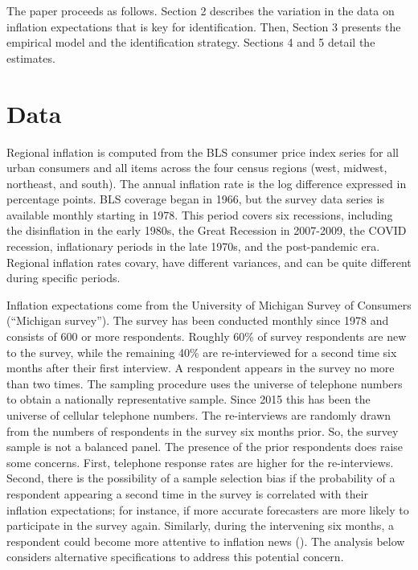 \documentclass[12pt]{article}
\begin{document}
The paper proceeds as follows. Section 2 describes the variation in the data on inflation expectations that is key for identification. Then, Section 3 presents the empirical model and the identification strategy. Sections 4 and 5 detail the estimates.

\section{Data}

Regional inflation is computed from the BLS consumer price index series for all urban consumers and all items across the four census regions (west, midwest, northeast, and south). The annual inflation rate is the log difference expressed in percentage points. BLS coverage began in 1966, but the survey data series is available monthly starting in 1978. This period covers six recessions, including the disinflation in the early 1980s, the Great Recession in 2007-2009, the COVID recession, inflationary periods in the late 1970s, and the post-pandemic era. Regional inflation rates covary, have different variances, and can be quite different during specific periods. 

Inflation expectations come from the University of Michigan Survey of Consumers (``Michigan survey''). The survey has been conducted monthly since 1978 and consists of 600 or more respondents. Roughly 60\% of survey respondents are new to the survey, while the remaining 40\% are re-interviewed for a second time six months after their first interview. A respondent appears in the survey no more than two times. The sampling procedure uses the universe of telephone numbers to obtain a nationally representative sample. Since 2015 this has been the universe of cellular telephone numbers. The re-interviews are randomly drawn from the numbers of respondents in the survey six months prior. So, the survey sample is not a balanced panel. The presence of the prior respondents does raise some concerns. First, telephone response rates are higher for the re-interviews. Second, there is the possibility of a sample selection bias if the probability of a respondent appearing a second time in the survey is correlated with their inflation expectations; for instance, if more accurate forecasters are more likely to participate in the survey again. Similarly, during the intervening six months, a respondent could become more attentive to inflation news (\cite{BinderKim:AEJM2021}). The analysis below considers alternative specifications to address this potential concern.
\end{document}
